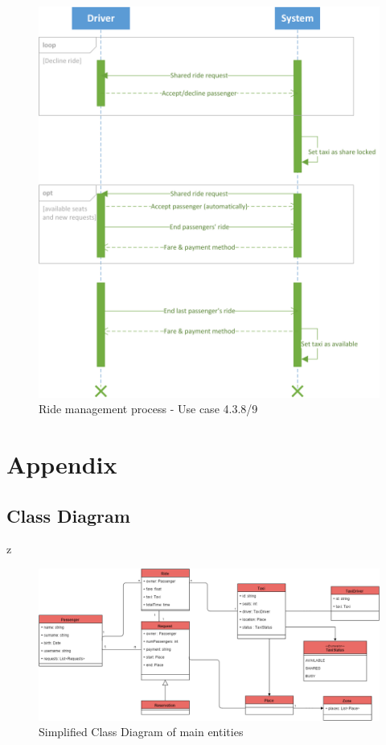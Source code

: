 \documentclass{article}
\begin{document}
        \begin{figure}[h!]
        \centering
        \includegraphics[width=1\columnwidth]{sequenceDiagram/shared-driver}
        \caption{Ride management process - Use case 4.3.8/9}
        \label{fig:seq-shdr}
    \end{figure}

\clearpage

\section{Appendix}

\subsection{Class Diagram}z
\begin{figure}[h!]
        \centering
        \includegraphics[width=1\columnwidth]{classDiagram/Class-Diagram}
        \caption{Simplified Class Diagram of main entities}
        \label{fig:class-diagram}
    \end{figure}
\end{document}
